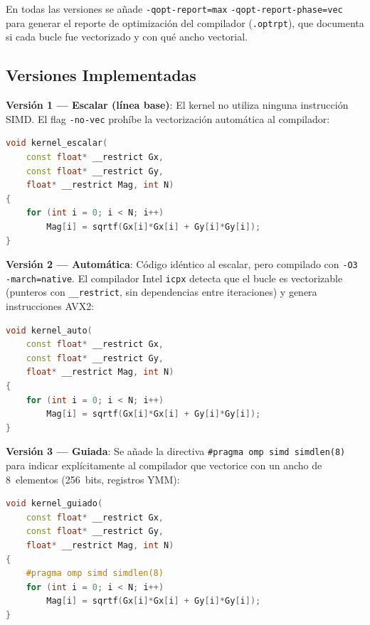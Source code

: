 En todas las versiones se a\~nade \texttt{-qopt-report=max}
\texttt{-qopt-report-phase=vec} para generar el reporte de
optimizaci\'on del compilador (\texttt{.optrpt}), que
documenta si cada bucle fue vectorizado y con qu\'e ancho
vectorial.

\subsection{Versiones Implementadas}

\textbf{Versi\'on 1 — Escalar (l\'inea base)}: El kernel
no utiliza ninguna instrucci\'on SIMD.
El flag \texttt{-no-vec} proh\'ibe la vectorizaci\'on
autom\'atica al compilador:

\begin{lstlisting}[language=C++,caption={Kernel escalar (versi\'on de referencia).}]
void kernel_escalar(
    const float* __restrict Gx,
    const float* __restrict Gy,
    float* __restrict Mag, int N)
{
    for (int i = 0; i < N; i++)
        Mag[i] = sqrtf(Gx[i]*Gx[i] + Gy[i]*Gy[i]);
}
\end{lstlisting}

\textbf{Versi\'on 2 — Autom\'atica}: C\'odigo id\'entico al
escalar, pero compilado con \texttt{-O3 -march=native}.
El compilador Intel \texttt{icpx} detecta que el bucle es
vectorizable (punteros con \texttt{\_\_restrict}, sin
dependencias entre iteraciones) y genera instrucciones AVX2:

\begin{lstlisting}[language=C++,caption={Kernel con vectorizaci\'on autom\'atica.}]
void kernel_auto(
    const float* __restrict Gx,
    const float* __restrict Gy,
    float* __restrict Mag, int N)
{
    for (int i = 0; i < N; i++)
        Mag[i] = sqrtf(Gx[i]*Gx[i] + Gy[i]*Gy[i]);
}
\end{lstlisting}

\textbf{Versi\'on 3 — Guiada}: Se a\~nade la directiva
\texttt{\#pragma omp simd simdlen(8)} para indicar expl\'icitamente
al compilador que vectorice con un ancho de 8~elementos
(256~bits, registros YMM):

\begin{lstlisting}[language=C++,caption={Kernel con vectorizaci\'on guiada.}]
void kernel_guiado(
    const float* __restrict Gx,
    const float* __restrict Gy,
    float* __restrict Mag, int N)
{
    #pragma omp simd simdlen(8)
    for (int i = 0; i < N; i++)
        Mag[i] = sqrtf(Gx[i]*Gx[i] + Gy[i]*Gy[i]);
}
\end{lstlisting}

